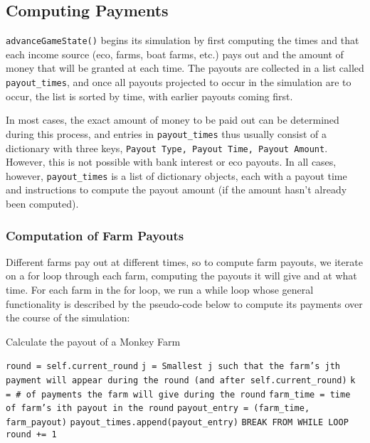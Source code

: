 \documentclass[12pt,letterpaper]{article}
\theoremstyle{remark}
\theoremstyle{plain}
\begin{document}
\subsection{Computing Payments}

\texttt{advanceGameState()} begins its simulation by first computing the times and that each income source (eco, farms, boat farms, etc.) pays out and the amount of money that will be granted at each time. The payouts are collected in a list called \texttt{payout\_times}, and once all payouts projected to occur in the simulation are to occur, the list is sorted by time, with earlier payouts coming first.

In most cases, the exact amount of money to be paid out can be determined during this process, and entries in \texttt{payout\_times} thus usually consist of a dictionary with three keys, \texttt{Payout Type, Payout Time, Payout Amount}. However, this is not possible with bank interest or eco payouts. In all cases, however, \texttt{payout\_times} is a list of dictionary objects, each with a payout time and instructions to compute the payout amount (if the amount hasn't already been computed).

\subsubsection{Computation of Farm Payouts}\label{computation of farm payouts}

Different farms pay out at different times, so to compute farm payouts, we iterate on a for loop through each farm, computing the payouts it will give and at what time. For each farm in the for loop, we run a while loop whose general functionality is described by the pseudo-code below to compute its payments over the course of the simulation:

\begin{algorithm}
\caption{Calculate the payout of a Monkey Farm}
\begin{algorithmic}
\State \texttt{round = self.current\_round}
    \State \texttt{j = Smallest j such that the farm's jth payment will appear during the round (and after \texttt{self.current\_round})}
    \State \texttt{k = \# of payments the farm will give during the round}
        \State \texttt{farm\_time = time of farm's ith payout in the round}
            \State \texttt{payout\_entry = (farm\_time, farm\_payout)}
            \State \texttt{payout\_times.append(payout\_entry)}
        \Else
            \State \texttt{BREAK FROM WHILE LOOP}
        \EndIf
    \EndFor
    \State \texttt{round += 1}
\EndWhile
\end{algorithmic}
\end{algorithm}
\end{document}

